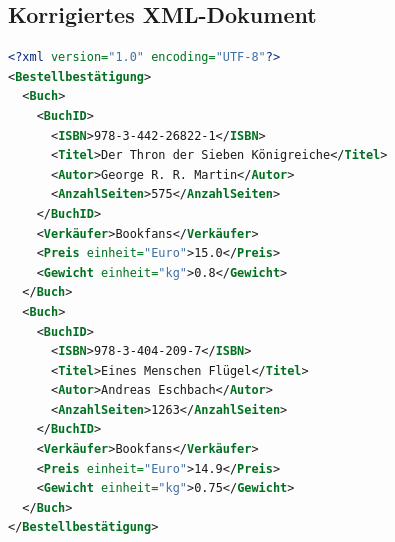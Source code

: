 \documentclass[12pt]{scrartcl}
\begin{document}
\subsection*{Korrigiertes XML-Dokument}

\begin{lstlisting}[language=XML]
<?xml version="1.0" encoding="UTF-8"?>
<Bestellbestätigung>
  <Buch>
    <BuchID>
      <ISBN>978-3-442-26822-1</ISBN>
      <Titel>Der Thron der Sieben Königreiche</Titel>
      <Autor>George R. R. Martin</Autor>
      <AnzahlSeiten>575</AnzahlSeiten>
    </BuchID>
    <Verkäufer>Bookfans</Verkäufer>
    <Preis einheit="Euro">15.0</Preis>
    <Gewicht einheit="kg">0.8</Gewicht>
  </Buch>
  <Buch>
    <BuchID>
      <ISBN>978-3-404-209-7</ISBN>
      <Titel>Eines Menschen Flügel</Titel>
      <Autor>Andreas Eschbach</Autor>
      <AnzahlSeiten>1263</AnzahlSeiten>
    </BuchID>
    <Verkäufer>Bookfans</Verkäufer>
    <Preis einheit="Euro">14.9</Preis>
    <Gewicht einheit="kg">0.75</Gewicht>
  </Buch>
</Bestellbestätigung>
\end{lstlisting}
\end{document}
